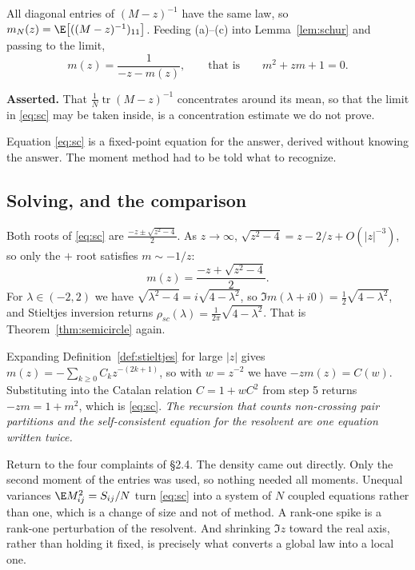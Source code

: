 \documentclass[11pt]{article}
\providecommand{\Tr}{\operatorname{tr}}
\begin{document}
All diagonal entries of $(M-z)^{-1}$ have the same law, so $m_N(z)=\E\big[((M-z)^{-1})_{11}\big]$. Feeding (a)--(c) into Lemma~\ref{lem:schur} and passing to the limit,
\begin{equation}\label{eq:sc}
\boxed{\ m(z)=\frac{1}{-z-m(z)},\qquad\text{that is}\qquad m^2+zm+1=0.\ }
\end{equation}

\begin{imported}
\textbf{Asserted.} That $\frac1N\Tr(M-z)^{-1}$ concentrates around its mean, so that the limit in \eqref{eq:sc} may be taken inside, is a concentration estimate we do not prove.
\end{imported}

Equation \eqref{eq:sc} is a fixed-point equation for the answer, derived without knowing the answer. The moment method had to be told what to recognize.

\subsection{Solving, and the comparison}

Both roots of \eqref{eq:sc} are $\frac{-z\pm\sqrt{z^2-4}}{2}$. As $z\to\infty$, $\sqrt{z^2-4}=z-2/z+O(|z|^{-3})$, so only the $+$ root satisfies $m\sim-1/z$:
\[
m(z)=\frac{-z+\sqrt{z^2-4}}{2}.
\]
For $\lambda\in(-2,2)$ we have $\sqrt{\lambda^2-4}=i\sqrt{4-\lambda^2}$, so $\Im m(\lambda+i0)=\tfrac12\sqrt{4-\lambda^2}$, and Stieltjes inversion returns $\rho_{sc}(\lambda)=\frac{1}{2\pi}\sqrt{4-\lambda^2}$. That is Theorem~\ref{thm:semicircle} again.

\begin{remark}
Expanding Definition~\ref{def:stieltjes} for large $|z|$ gives $m(z)=-\sum_{k\ge0}C_kz^{-(2k+1)}$, so with $w=z^{-2}$ we have $-zm(z)=C(w)$. Substituting into the Catalan relation $C=1+wC^2$ from step 5 returns $-zm=1+m^2$, which is \eqref{eq:sc}. \emph{The recursion that counts non-crossing pair partitions and the self-consistent equation for the resolvent are one equation written twice.}
\end{remark}

Return to the four complaints of \S2.4. The density came out directly. Only the second moment of the entries was used, so nothing needed all moments. Unequal variances $\E M_{ij}^2=S_{ij}/N$ turn \eqref{eq:sc} into a system of $N$ coupled equations rather than one, which is a change of size and not of method. A rank-one spike is a rank-one perturbation of the resolvent. And shrinking $\Im z$ toward the real axis, rather than holding it fixed, is precisely what converts a global law into a local one.
\end{document}
